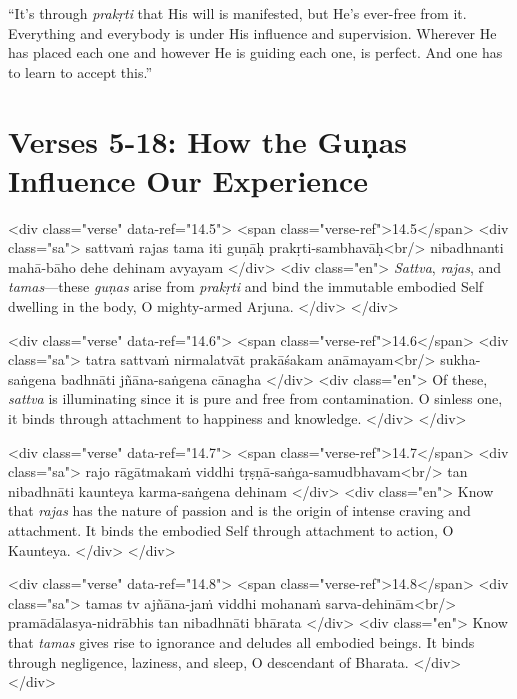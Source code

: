 \enquote{It’s through \textit{prakṛti} that His will is manifested, but He’s ever-free from it. Everything and everybody is under His influence and supervision. Wherever He has placed each one and however He is guiding each one, is perfect. And one has to learn to accept this.}

\section{Verses 5-18: How the Guṇas Influence Our Experience}\label{sec-verses-5-18-how-the-gunas-influence-our-experience}


\begin{html}
<div class="verse" data-ref="14.5">
  <span class="verse-ref">14.5</span>
  <div class="sa">
    sattvaṁ rajas tama iti guṇāḥ prakṛti-sambhavāḥ<br/>
    nibadhnanti mahā-bāho dehe dehinam avyayam
  </div>
  <div class="en">
    \textit{Sattva}, \textit{rajas}, and \textit{tamas}---these \textit{guṇas} arise from \textit{prakṛti} and bind the immutable embodied Self dwelling in the body, O mighty-armed Arjuna.
  </div>
</div>
\end{html}



\begin{html}
<div class="verse" data-ref="14.6">
  <span class="verse-ref">14.6</span>
  <div class="sa">
    tatra sattvaṁ nirmalatvāt prakāśakam anāmayam<br/>
    sukha-saṅgena badhnāti jñāna-saṅgena cānagha
  </div>
  <div class="en">
    Of these, \textit{sattva} is illuminating since it is pure and free from contamination. O sinless one, it binds through attachment to happiness and knowledge.
  </div>
</div>
\end{html}



\begin{html}
<div class="verse" data-ref="14.7">
  <span class="verse-ref">14.7</span>
  <div class="sa">
    rajo rāgātmakaṁ viddhi tṛṣṇā-saṅga-samudbhavam<br/>
    tan nibadhnāti kaunteya karma-saṅgena dehinam
  </div>
  <div class="en">
    Know that \textit{rajas} has the nature of passion and is the origin of intense craving and attachment. It binds the embodied Self through attachment to action, O Kaunteya.
  </div>
</div>
\end{html}



\begin{html}
<div class="verse" data-ref="14.8">
  <span class="verse-ref">14.8</span>
  <div class="sa">
    tamas tv ajñāna-jaṁ viddhi mohanaṁ sarva-dehinām<br/>
    pramādālasya-nidrābhis tan nibadhnāti bhārata
  </div>
  <div class="en">
    Know that \textit{tamas} gives rise to ignorance and deludes all embodied beings. It binds through negligence, laziness, and sleep, O descendant of Bharata.
  </div>
</div>
\end{html}



